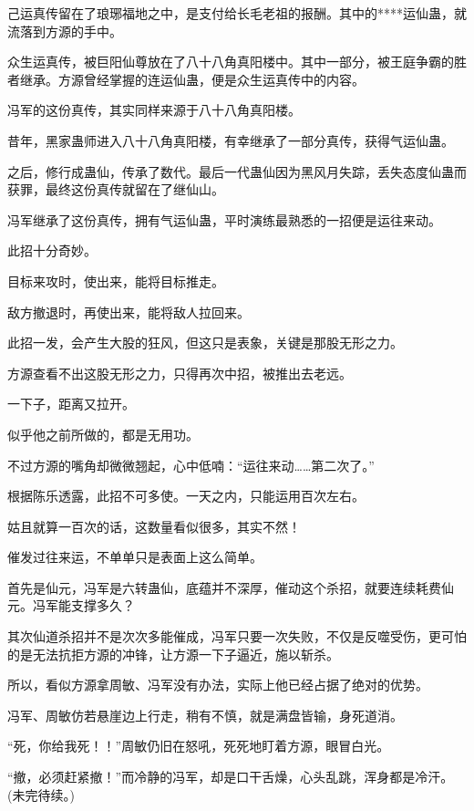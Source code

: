 \begin{this_body}
己运真传留在了琅琊福地之中，是支付给长毛老祖的报酬。其中的****运仙蛊，就流落到方源的手中。

众生运真传，被巨阳仙尊放在了八十八角真阳楼中。其中一部分，被王庭争霸的胜者继承。方源曾经掌握的连运仙蛊，便是众生运真传中的内容。

冯军的这份真传，其实同样来源于八十八角真阳楼。

昔年，黑家蛊师进入八十八角真阳楼，有幸继承了一部分真传，获得气运仙蛊。

之后，修行成蛊仙，传承了数代。最后一代蛊仙因为黑风月失踪，丢失态度仙蛊而获罪，最终这份真传就留在了继仙山。

冯军继承了这份真传，拥有气运仙蛊，平时演练最熟悉的一招便是运往来动。

此招十分奇妙。

目标来攻时，使出来，能将目标推走。

敌方撤退时，再使出来，能将敌人拉回来。

此招一发，会产生大股的狂风，但这只是表象，关键是那股无形之力。

方源查看不出这股无形之力，只得再次中招，被推出去老远。

一下子，距离又拉开。

似乎他之前所做的，都是无用功。

不过方源的嘴角却微微翘起，心中低喃：“运往来动……第二次了。”

根据陈乐透露，此招不可多使。一天之内，只能运用百次左右。

姑且就算一百次的话，这数量看似很多，其实不然！

催发过往来运，不单单只是表面上这么简单。

首先是仙元，冯军是六转蛊仙，底蕴并不深厚，催动这个杀招，就要连续耗费仙元。冯军能支撑多久？

其次仙道杀招并不是次次多能催成，冯军只要一次失败，不仅是反噬受伤，更可怕的是无法抗拒方源的冲锋，让方源一下子逼近，施以斩杀。

所以，看似方源拿周敏、冯军没有办法，实际上他已经占据了绝对的优势。

冯军、周敏仿若悬崖边上行走，稍有不慎，就是满盘皆输，身死道消。

“死，你给我死！！”周敏仍旧在怒吼，死死地盯着方源，眼冒白光。

“撤，必须赶紧撤！”而冷静的冯军，却是口干舌燥，心头乱跳，浑身都是冷汗。(未完待续。)

\end{this_body}

